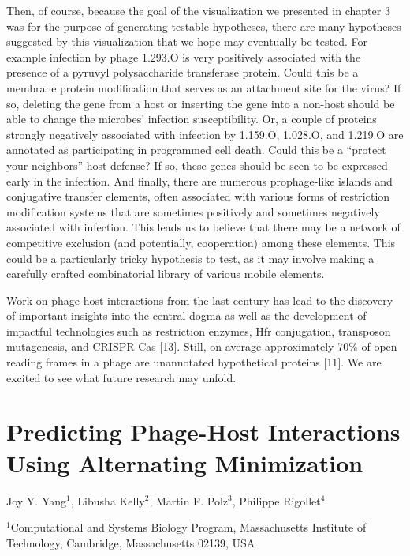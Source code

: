 \documentclass[12pt,twoside]{mitthesis-manusdown}
\begin{document}
Then, of course, because the goal of the visualization we presented in
chapter 3 was for the purpose of generating testable hypotheses, there
are many hypotheses suggested by this visualization that we hope may
eventually be tested. For example infection by phage 1.293.O is very
positively associated with the presence of a pyruvyl polysaccharide
transferase protein. Could this be a membrane protein modification that
serves as an attachment site for the virus? If so, deleting the gene
from a host or inserting the gene into a non-host should be able to
change the microbes' infection susceptibility. Or, a couple of proteins
strongly negatively associated with infection by 1.159.O, 1.028.O, and
1.219.O are annotated as participating in programmed cell death. Could
this be a ``protect your neighbors'' host defense? If so, these genes
should be seen to be expressed early in the infection. And finally,
there are numerous prophage-like islands and conjugative transfer
elements, often associated with various forms of restriction
modification systems that are sometimes positively and sometimes
negatively associated with infection. This leads us to believe that
there may be a network of competitive exclusion (and potentially,
cooperation) among these elements. This could be a particularly tricky
hypothesis to test, as it may involve making a carefully crafted
combinatorial library of various mobile elements.

Work on phage-host interactions from the last century has lead to the
discovery of important insights into the central dogma as well as the
development of impactful technologies such as restriction enzymes, Hfr
conjugation, transposon mutagenesis, and CRISPR-Cas {[}13{]}. Still, on
average approximately 70\% of open reading frames in a phage are
unannotated hypothetical proteins {[}11{]}. We are excited to see what
future research may unfold.

\appendix

\chapter{Predicting Phage-Host Interactions Using Alternating
Minimization}\label{predicting-phage-host-interactions-using-alternating-minimization}

\singlespace
Joy Y. Yang\(^1\), Libusha Kelly\(^2\), Martin F. Polz\(^3\), Philippe
Rigollet\(^4\) \newline 

\noindent \(^1\)Computational and Systems Biology Program, Massachusetts
Institute of Technology, Cambridge, Massachusetts 02139, USA
\end{document}
